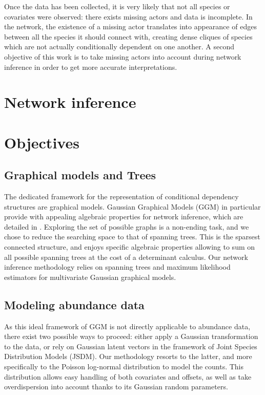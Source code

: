 Once the data has been collected, it is very likely that not all species or covariates were observed: there exists missing actors and data is incomplete. In the network, the existence of a missing actor translates into appearance of edges between all the species it should connect with, creating dense cliques of species which are not actually conditionally dependent on one another. A second objective of this work is to take missing actors into account during network inference in order to get more accurate interpretations.

\section*{Network inference}
\section*{Objectives}
 \subsection*{Graphical models and Trees}
The dedicated framework for the representation of conditional dependency structures are graphical models. Gaussian Graphical Models (GGM) in particular provide with appealing algebraic properties for network inference, which are detailed in \citet{Lau96}. Exploring the set of possible graphs is a non-ending task, and we chose to reduce the searching space to that of spanning trees. This is the sparsest connected structure, and enjoys specific algebraic properties allowing to sum on all possible spanning trees at the cost of a determinant calculus. Our network inference methodology relies on spanning trees and \citet{Lau96} maximum likelihood estimators for multivariate Gaussian graphical models.

 \subsection*{Modeling abundance data}
 As this ideal framework of GGM is not directly applicable to abundance data, there exist two possible ways to proceed: either apply a Gaussian transformation to the data, or rely on Gaussian latent vectors in the framework of Joint Species Distribution Models (JSDM). Our methodology resorts to the latter, and more specifically to the Poisson log-normal distribution to model the counts. This distribution allows easy handling of both covariates and offsets, as well as take overdispersion into account thanks to its Gaussian random parameters. 
 
